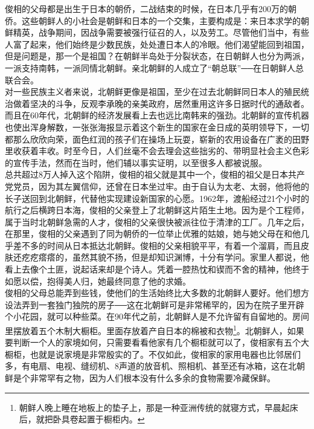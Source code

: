 俊相的父母都是出生于日本的朝侨，二战结束的时候，在日本几乎有200万的朝侨。这些朝鲜人的小社会是朝鲜和日本的一个交集，主要构成是：来日本求学的朝鲜精英，战争期间，因战争需要被强行征召的人，以及劳工。尽管他们当中，有些人富了起来，他们始终是少数民族，处处遭日本人的冷眼。他们渴望能回到祖国，但是问题是，那一个是祖国？在朝鲜半岛处于分裂状态，在日朝鲜人也分为两派，一派支持南韩，一派同情北朝鲜。亲北朝鲜的人成立了“朝总联”──在日朝鲜人总联合会。\\

对一些民族主义者来说，北朝鲜更像是祖国，至少在过去北朝鲜同日本人的殖民统治做着坚决的斗争，反观李承晚的亲美政府，居然重用这许多日据时代的通敌者。而且在60年代，北朝鲜的经济发展看上去也远比南韩来的强劲。北朝鲜的宣传机器也使出浑身解数，一张张海报显示着这个新生的国家在金日成的英明领导下，一切都那么欣欣向荣，面色红润的孩子们在操场上玩耍，崭新的农用设备在广袤的田野里收获着丰收。时至今日，人们丝毫不会去理会这些拙劣的、带明显社会主义色彩的宣传手法，然而在当时，他们辅以事实证明，以至很多人都被说服。\\

总共超过8万人掉入这个陷阱，俊相的祖父就是其中一个，俊相的祖父是日本共产党党员，因为其左翼信仰，还曾在日本坐过牢。由于自认为太老、太弱，他将他的长子送回到北朝鲜，代替他实现建设新国家的心愿。1962年，渡船经过21个小时的航行之后横跨日本海，俊相的父亲登上了北朝鲜这片陌生土地。因为是个工程师，属于当时北朝鲜急需的人才，俊相的父亲很快被派往位于清津的工厂。几年之后，在那里，俊相的父亲遇到了同为朝侨的一位举止优雅的姑娘，她与她父母在和他几乎差不多的时间从日本抵达北朝鲜。俊相的父亲相貌平平，有着一个溜肩，而且皮肤还疙疙瘩瘩的，虽然其貌不扬，但是却知识渊博，十分有学问。家里人都说，他看上去像个土匪，说起话来却是个诗人。凭着一腔热忱和锲而不舍的精神，他终于如愿以偿，抱得美人归，她最终同意了他的求婚。\\

俊相的父母总能弄到些钱，使他们的生活始终比大多数的北朝鲜人要好。他们想方设法弄到一套独门独院的房子──这在北朝鲜可是非常稀罕的，因为在院子里开辟个小花园，就可以种些菜。在90年代之前，北朝鲜人是不允许留有自留地的。房间里摆放着五个木制大橱柜。里面存放着产自日本的棉被和衣物\footnote{朝鲜人晚上睡在地板上的垫子上，那是一种亚洲传统的就寝方式，早晨起床后，就把卧具卷起置于橱柜内。}。北朝鲜人，如果要判断一个人的家境如何，只需要看看他家有几个橱柜就可以了，俊相家有五个大橱柜，也就是说家境是非常殷实的了。不仅如此，俊相家的家用电器也比邻居们多，有电扇、电视、缝纫机、8声道的放音机、照相机、甚至还有冰箱，这在北朝鲜是个非常罕有之物，因为人们根本没有什么多余的食物需要冷藏保鲜。\\

